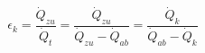 

\item[d)] 
    \[
    \epsilon_{k} = \frac{\dot{Q}_{zu}}{\dot{Q}_{t}} = \frac{\dot{Q}_{zu}}{\dot{Q}_{zu} - \dot{Q}_{ab}} = \frac{\dot{Q}_{k}}{\dot{Q}_{ab} - \dot{Q}_{k}}
    \]